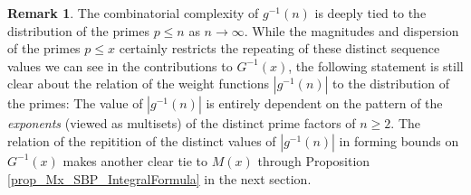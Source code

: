 \documentclass[11pt,reqno,a4letter]{article}
\numberwithin{figure}{section}
\numberwithin{table}{section}
\theoremstyle{plain}
\numberwithin{theorem}{section}
\theoremstyle{definition}
\newtheorem{remark}[theorem]{Remark}
\begin{document}
\begin{remark} 
The combinatorial complexity of $g^{-1}(n)$ is deeply tied to the distribution of the primes 
$p \leq n$ as $n \rightarrow \infty$. 
While the magnitudes and dispersion of the primes $p \leq x$ certainly restricts the 
repeating of these distinct sequence 
values we can see in the contributions to $G^{-1}(x)$, the following 
statement is still clear about the relation of the weight functions $|g^{-1}(n)|$ to the 
distribution of the primes: 
The value of $|g^{-1}(n)|$ is entirely dependent on the pattern of the \emph{exponents} 
(viewed as multisets) of the distinct prime factors of $n \geq 2$. 
The relation of the repitition of the distinct values 
of $|g^{-1}(n)|$ in forming bounds on $G^{-1}(x)$ makes another clear tie to 
$M(x)$ through Proposition \ref{prop_Mx_SBP_IntegralFormula} in the next section. 
\end{remark}
\end{document}
